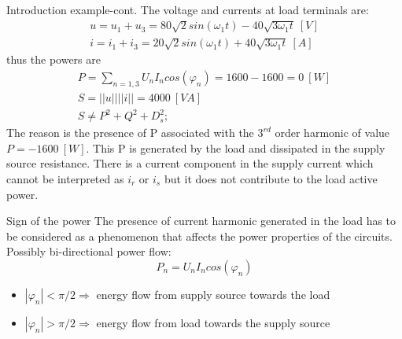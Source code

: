 \documentclass[aspectratio=169]{beamer}
\begin{document}
\begin{frame}{Introduction example-cont.}{\insertsection}
    The voltage and currents at load terminals are:
    \begin{gather}
      u=u_1+u_3 = 80\sqrt{2}sin(\omega_1t)-40\sqrt{3\omega_1t} \ \left[V\right]\\
      i=i_1+i_3 = 20\sqrt{2}sin(\omega_1t)+40\sqrt{3\omega_1t} \ \left[A\right]
    \end{gather}
    thus the powers are 
    \begin{gather}
      P=\sum_{n=1,3}U_nI_n cos(\varphi_n)=1600-1600=0 \ \left[W\right]\\
      S = ||u||||i|| = 4000 \ \left[VA\right]\\
      S \ne P^2+Q^2+D_s^2;
    \end{gather}
    The reason is the presence of P associated with the $3^{rd}$ order harmonic of value $P=-1600\ \left[W\right]$. This P is generated by the load and dissipated in the supply source resistance. \textcolor{NTNU_orange}{There is a current component in the supply current which cannot be interpreted as $i_r$ or $i_s$ but it does not contribute to the load active power.}
  \end{frame}

  \begin{frame}{Sign of the power}{\insertsection}
    \textcolor{NTNU_orange}{The presence of current harmonic generated in the load has to be considered as a phenomenon that affects the power properties of the circuits.}\\
    Possibly bi-directional power flow:
    \begin{equation}
      P_n = U_nI_n cos(\varphi_n)
    \end{equation}
    \begin{itemize}
      \item $|\varphi_n|<\pi/2 \Rightarrow$ energy flow from \textcolor{NTNU_blue}{supply source} towards the \textcolor{NTNU_green}{load}
      \item $|\varphi_n| >\pi/2 \Rightarrow$ energy flow  from \textcolor{NTNU_green}{load} towards the \textcolor{NTNU_blue}{supply source}
    \end{itemize}
\end{frame}
\end{document}
